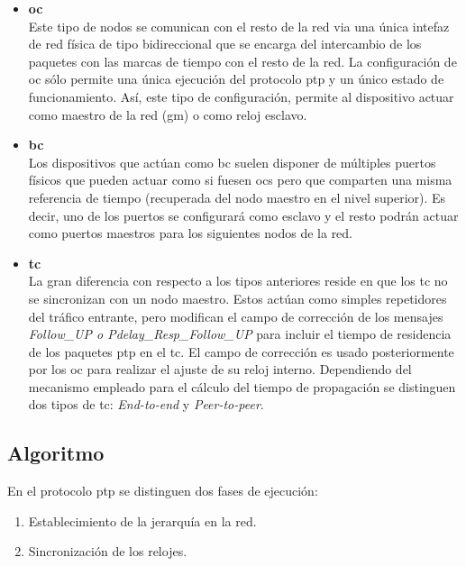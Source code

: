 \begin{itemize}	
	\item \textbf{\gls{oc}} \\
	Este tipo de nodos se comunican con el resto de la red via una única 
	intefaz de red física de tipo bidireccional que se encarga del intercambio 
	de los paquetes con las marcas de tiempo con el resto de la red. La 
	configuración de \gls{oc} sólo permite una única ejecución del 
	protocolo 
	\gls{ptp} y un único estado de funcionamiento. Así, este tipo de 
	configuración, permite al dispositivo actuar como maestro de la red 
	(\acrshort{gm}) o como reloj esclavo.
	
	\item \textbf{\gls{bc}} \\
	Los dispositivos que actúan como \acrshort{bc} suelen disponer de múltiples 
	puertos físicos que pueden actuar como si fuesen \gls{oc}s pero que 
	comparten una misma referencia de tiempo (recuperada del nodo maestro en el 
	nivel superior). Es decir, uno de los puertos se configurará como esclavo y 
	el resto podrán actuar como puertos maestros para los siguientes nodos de 
	la red.
	
	\item \textbf{\gls{tc}} \\
	La gran diferencia con respecto a los tipos anteriores reside en que los 
	\gls{tc} no se sincronizan con un nodo maestro. Estos actúan como simples 
	repetidores del tráfico entrante, pero modifican el campo de corrección de 
	los mensajes \textit{Follow\_UP o Pdelay\_Resp\_Follow\_UP} para incluir el 
	tiempo de residencia de los paquetes \gls{ptp} en el \gls{tc}. El campo de 
	corrección es usado posteriormente por los \gls{oc} para realizar el ajuste 
	de su reloj interno. 
	Dependiendo del mecanismo empleado para el cálculo del tiempo de 
	propagación se distinguen dos tipos de \gls{tc}: \textit{End-to-end} y 
	\textit{Peer-to-peer}.
\end{itemize}

\subsection{Algoritmo}

En el protocolo \gls{ptp} se distinguen dos fases de ejecución:
\begin{enumerate}
	\item Establecimiento de la jerarquía en la red.
	\item Sincronización de los relojes.
\end{enumerate}

